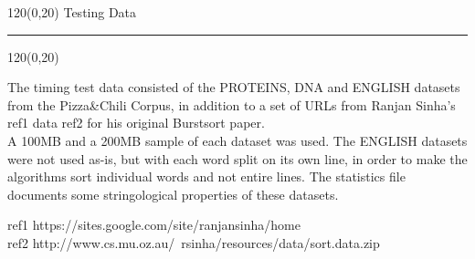 %

\begin{textblock}{120}(0,20)
\sffamily\normalsize{\color{sciorange}Testing Data}\small\\
\rule[3mm]{125mm}{0.1pt}
\end{textblock} 
\begin{textblock}{120}(0,20)
 \footnotesize 
\begin{multicols}{2}
The timing test data consisted of the PROTEINS, DNA and ENGLISH datasets from the Pizza\&Chili Corpus, in addition to a set of URLs from Ranjan Sinha's ref1 data ref2 for his original Burstsort paper. \\

A 100MB and a 200MB sample of each dataset was used. The ENGLISH datasets were not used as-is, but with each word split on its own line, in order to make the algorithms sort individual words and not entire lines. The statistics file documents some stringological properties of these datasets.

ref1 https://sites.google.com/site/ranjansinha/home \\
ref2 http://www.cs.mu.oz.au/~rsinha/resources/data/sort.data.zip \\
\end{multicols}




\end{textblock} 

